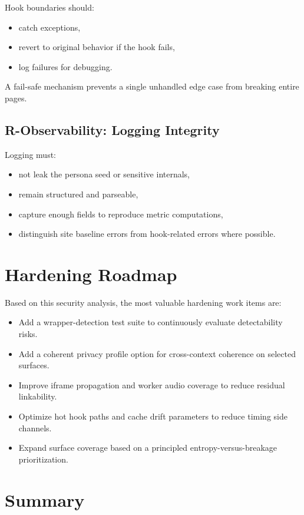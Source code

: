 \documentclass[11pt]{report}
\begin{document}
Hook boundaries should:
\begin{itemize}
    \item catch exceptions,
    \item revert to original behavior if the hook fails,
    \item log failures for debugging.
\end{itemize}

A fail-safe mechanism prevents a single unhandled edge case from breaking entire pages.

\subsection{R-Observability: Logging Integrity}

Logging must:
\begin{itemize}
    \item not leak the persona seed or sensitive internals,
    \item remain structured and parseable,
    \item capture enough fields to reproduce metric computations,
    \item distinguish site baseline errors from hook-related errors where possible.
\end{itemize}

\section{Hardening Roadmap}

Based on this security analysis, the most valuable hardening work items are:

\begin{itemize}
    \item Add a wrapper-detection test suite to continuously evaluate detectability risks.
    \item Add a coherent privacy profile option for cross-context coherence on selected surfaces.
    \item Improve iframe propagation and worker audio coverage to reduce residual linkability.
    \item Optimize hot hook paths and cache drift parameters to reduce timing side channels.
    \item Expand surface coverage based on a principled entropy-versus-breakage prioritization.
\end{itemize}

\section{Summary}
\end{document}
